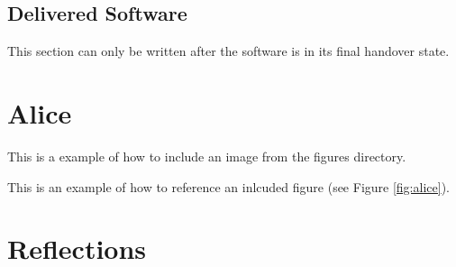 \documentclass{l3proj}
\begin{document}

\subsection{Delivered Software}
\label{sec:finsoftware}
This section can only be written after the software is in its final handover state.
\newpage


\section{Alice}
\label{sec:alice}

This is a example of how to include an image from the figures directory.



This is an example of how to reference an inlcuded figure (see Figure \ref{fig:alice}).

\section{Reflections}
\label{sec:reflections}

\end{document}
